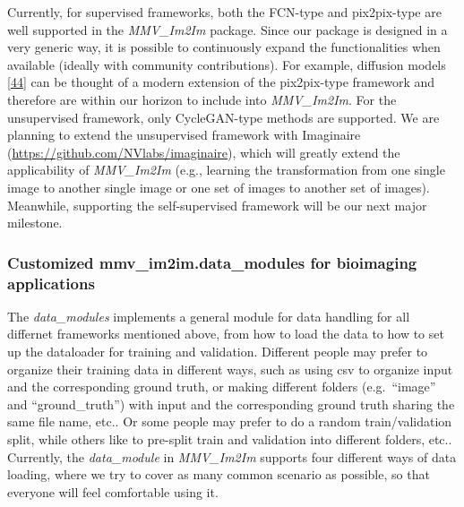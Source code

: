 Currently, for supervised frameworks, both the FCN-type and pix2pix-type are well supported in the \emph{MMV\_Im2Im} package. Since our package is designed in a very generic way, it is possible to continuously expand the functionalities when available (ideally with community contributions). For example, diffusion models {[}\protect\hyperlink{ref-1A3yurr7m}{44}{]} can be thought of a modern extension of the pix2pix-type framework and therefore are within our horizon to include into \emph{MMV\_Im2Im}. For the unsupervised framework, only CycleGAN-type methods are supported. We are planning to extend the unsupervised framework with Imaginaire (\url{https://github.com/NVlabs/imaginaire}), which will greatly extend the applicability of \emph{MMV\_Im2Im} (e.g., learning the transformation from one single image to another single image or one set of images to another set of images). Meanwhile, supporting the self-supervised framework will be our next major milestone.

\hypertarget{customized-mmv_im2im.data_modules-for-bioimaging-applications}{%
\subsubsection{Customized mmv\_im2im.data\_modules for bioimaging applications}\label{customized-mmv_im2im.data_modules-for-bioimaging-applications}}

The \emph{data\_modules} implements a general module for data handling for all differnet frameworks mentioned above, from how to load the data to how to set up the dataloader for training and validation. Different people may prefer to organize their training data in different ways, such as using csv to organize input and the corresponding ground truth, or making different folders (e.g.~``image'' and ``ground\_truth'') with input and the corresponding ground truth sharing the same file name, etc.. Or some people may prefer to do a random train/validation split, while others like to pre-split train and validation into different folders, etc.. Currently, the \emph{data\_module} in \emph{MMV\_Im2Im} supports four different ways of data loading, where we try to cover as many common scenario as possible, so that everyone will feel comfortable using it.

